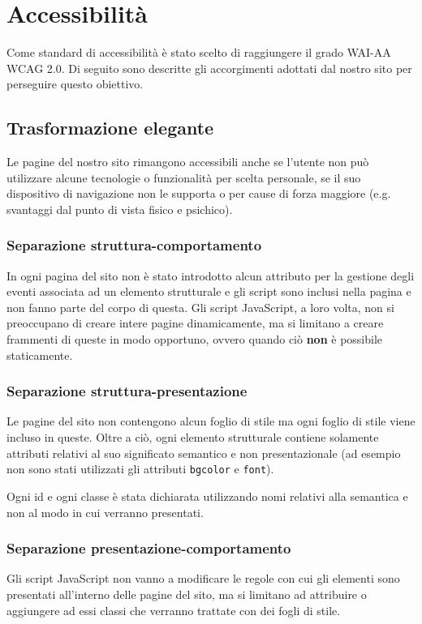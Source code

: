 \section{Accessibilità}
Come standard di accessibilità è stato scelto di raggiungere il grado WAI-AA
WCAG 2.0. Di seguito sono descritte gli accorgimenti adottati dal nostro sito
per perseguire questo obiettivo.

\subsection{Trasformazione elegante}
Le pagine del nostro sito rimangono accessibili anche se l'utente non può
utilizzare alcune tecnologie o funzionalità per scelta personale, se il
suo dispositivo di navigazione non le supporta o per cause di forza maggiore
(e.g. svantaggi dal punto di vista fisico e psichico).

\subsubsection{Separazione struttura-comportamento}
In ogni pagina del sito non è stato introdotto alcun attributo per la gestione
degli eventi associata ad un elemento strutturale e gli script sono inclusi
nella pagina e non fanno parte del corpo di questa.
Gli script JavaScript, a loro volta, non si preoccupano di creare intere pagine
dinamicamente, ma si limitano a creare frammenti di queste in modo opportuno,
ovvero quando ciò \textbf{non} è possibile staticamente.

\subsubsection{Separazione struttura-presentazione}
Le pagine del sito non contengono alcun foglio di stile ma ogni foglio di stile
viene incluso in queste. Oltre a ciò, ogni elemento strutturale contiene
solamente attributi relativi al suo significato semantico e non presentazionale
(ad esempio non sono stati utilizzati gli attributi \texttt{bgcolor} e
\texttt{font}).

Ogni id e ogni classe è stata dichiarata utilizzando nomi relativi alla
semantica e non al modo in cui verranno presentati.

\subsubsection{Separazione presentazione-comportamento}
Gli script JavaScript non vanno a modificare le regole con cui gli elementi
sono presentati all'interno delle pagine del sito, ma si limitano ad attribuire
o aggiungere ad essi classi che verranno trattate con dei fogli di stile.

